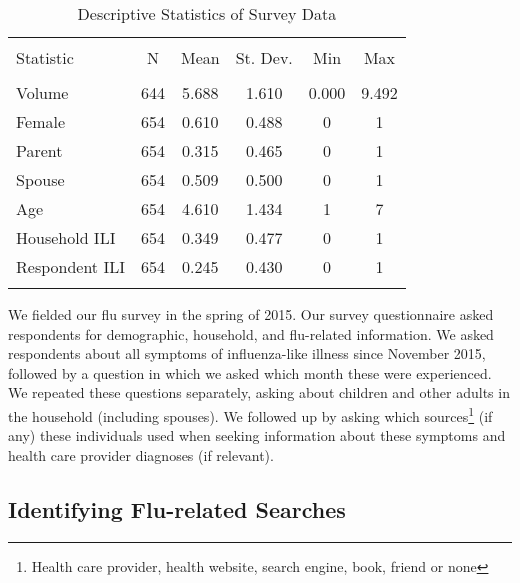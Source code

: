 \documentclass[fleqn,10pt]{wlscirep}
\begin{document}
\begin{table}[!htbp] \centering 
  \caption{Descriptive Statistics of Survey Data} 
  \label{tab: Descriptives} 
\begin{tabular}{@{\extracolsep{5pt}}lccccc} 
\\[-1.8ex]\hline 
\hline \\[-1.8ex] 
Statistic & \multicolumn{1}{c}{N} & \multicolumn{1}{c}{Mean} & \multicolumn{1}{c}{St. Dev.} & \multicolumn{1}{c}{Min} & \multicolumn{1}{c}{Max} \\ 
\hline \\[-1.8ex] 
Volume & 644 & 5.688 & 1.610 & 0.000 & 9.492 \\ 
Female & 654 & 0.610 & 0.488 & 0 & 1 \\ 
Parent & 654 & 0.315 & 0.465 & 0 & 1 \\ 
Spouse & 654 & 0.509 & 0.500 & 0 & 1 \\ 
Age & 654 & 4.610 & 1.434 & 1 & 7 \\ 
Household ILI & 654 & 0.349 & 0.477 & 0 & 1 \\ 
Respondent ILI & 654 & 0.245 & 0.430 & 0 & 1 \\ 
\hline \\[-1.8ex] 
\end{tabular} 
\end{table} 

We fielded our flu survey in the spring of 2015. Our survey questionnaire asked respondents for demographic, household, and flu-related information. We asked respondents about all symptoms of influenza-like illness since November 2015, followed by a question in which we asked which month these were experienced. We repeated these questions separately, asking about children and other adults in the household (including spouses). We followed up by asking which sources\footnote{Health care provider, health website, search engine, book, friend or none} (if any) these individuals used when seeking information about these symptoms and health care provider diagnoses (if relevant).

\subsection*{Identifying Flu-related Searches}
\end{document}
